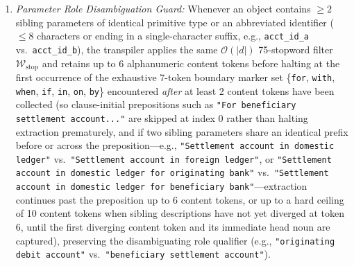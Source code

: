 \documentclass[conference,10pt]{IEEEtran}
\begin{document}
\begin{enumerate}
    \item \textit{Parameter Role Disambiguation Guard:} Whenever an object contains $\ge 2$ sibling parameters of identical primitive type or an abbreviated identifier ($\le 8$ characters or ending in a single-character suffix, e.g., \texttt{acct\_id\_a} vs.\ \texttt{acct\_id\_b}), the transpiler applies the same $\mathcal{O}(|d|)$ 75-stopword filter $\mathcal{W}_{\text{stop}}$ and retains up to 6 alphanumeric content tokens before halting at the first occurrence of the exhaustive 7-token boundary marker set \{\texttt{for}, \texttt{with}, \texttt{when}, \texttt{if}, \texttt{in}, \texttt{on}, \texttt{by}\} encountered \textit{after} at least 2 content tokens have been collected (so clause-initial prepositions such as \texttt{"For beneficiary settlement account..."} are skipped at index $0$ rather than halting extraction prematurely, and if two sibling parameters share an identical prefix before or across the preposition---e.g., \texttt{"Settlement account in domestic ledger"} vs.\ \texttt{"Settlement account in foreign ledger"}, or \texttt{"Settlement account in domestic ledger for originating bank"} vs.\ \texttt{"Settlement account in domestic ledger for beneficiary bank"}---extraction continues past the preposition up to 6 content tokens, or up to a hard ceiling of 10 content tokens when sibling descriptions have not yet diverged at token 6, until the first diverging content token and its immediate head noun are captured), preserving the disambiguating role qualifier (e.g., \texttt{"originating debit account"} vs.\ \texttt{"beneficiary settlement account"}).
\end{enumerate}
\end{document}
